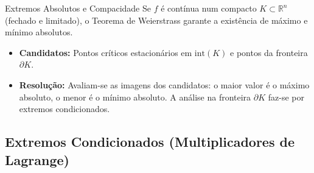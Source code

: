 \documentclass[11pt,a4paper]{article}
\newcommand{\R}{\mathbb{R}}
\begin{document}
\noindent\begin{theorembox}{Extremos Absolutos e Compacidade}
  Se $f$ é contínua num compacto $K \subset \R^n$ (fechado e limitado), o Teorema de Weierstrass garante a existência de máximo e mínimo absolutos.
  \begin{itemize}
    \item \textbf{Candidatos:} Pontos críticos estacionários em $\text{int}(K)$ e pontos da fronteira $\partial K$.
    \item \textbf{Resolução:} Avaliam-se as imagens dos candidatos: o maior valor é o máximo absoluto, o menor é o mínimo absoluto. A análise na fronteira $\partial K$ faz-se por extremos condicionados.
  \end{itemize}
\end{theorembox}

\subsection{Extremos Condicionados (Multiplicadores de Lagrange)}
\end{document}
